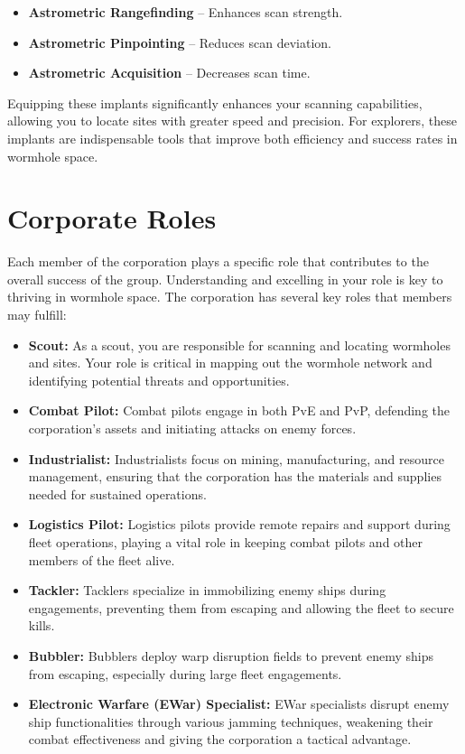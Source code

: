 \documentclass[a4paper,12pt]{article}
\begin{document}
\begin{itemize}
    \item \textbf{Astrometric Rangefinding} – Enhances scan strength.
    \item \textbf{Astrometric Pinpointing} – Reduces scan deviation.
    \item \textbf{Astrometric Acquisition} – Decreases scan time.
\end{itemize}

Equipping these implants significantly enhances your scanning capabilities, allowing you to locate sites with greater speed and precision. For explorers, these implants are indispensable tools that improve both efficiency and success rates in wormhole space.

\section{Corporate Roles}

Each member of the corporation plays a specific role that contributes to the overall success of the group. Understanding and excelling in your role is key to thriving in wormhole space. The corporation has several key roles that members may fulfill:
\begin{itemize}
    \item \textbf{Scout:} As a scout, you are responsible for scanning and locating wormholes and sites. Your role is critical in mapping out the wormhole network and identifying potential threats and opportunities.
    \item \textbf{Combat Pilot:} Combat pilots engage in both PvE and PvP, defending the corporation's assets and initiating attacks on enemy forces.
    \item \textbf{Industrialist:} Industrialists focus on mining, manufacturing, and resource management, ensuring that the corporation has the materials and supplies needed for sustained operations.
    \item \textbf{Logistics Pilot:} Logistics pilots provide remote repairs and support during fleet operations, playing a vital role in keeping combat pilots and other members of the fleet alive.
    \item \textbf{Tackler:} Tacklers specialize in immobilizing enemy ships during engagements, preventing them from escaping and allowing the fleet to secure kills.
    \item \textbf{Bubbler:} Bubblers deploy warp disruption fields to prevent enemy ships from escaping, especially during large fleet engagements.
    \item \textbf{Electronic Warfare (EWar) Specialist:} EWar specialists disrupt enemy ship functionalities through various jamming techniques, weakening their combat effectiveness and giving the corporation a tactical advantage.
\end{itemize}
\end{document}
